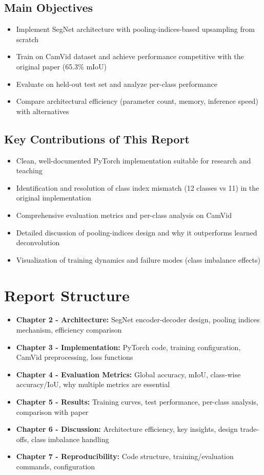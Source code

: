 \documentclass[11pt,a4paper]{report}
\begin{document}
\subsection*{Main Objectives}
\begin{itemize}
  \item Implement SegNet architecture with pooling-indices-based upsampling from scratch
  \item Train on CamVid dataset and achieve performance competitive with the original paper (65.3\% mIoU)
  \item Evaluate on held-out test set and analyze per-class performance
  \item Compare architectural efficiency (parameter count, memory, inference speed) with alternatives
\end{itemize}

\subsection*{Key Contributions of This Report}
\begin{itemize}
  \item Clean, well-documented PyTorch implementation suitable for research and teaching
  \item Identification and resolution of class index mismatch (12 classes vs 11) in the original implementation
  \item Comprehensive evaluation metrics and per-class analysis on CamVid
  \item Detailed discussion of pooling-indices design and why it outperforms learned deconvolution
  \item Visualization of training dynamics and failure modes (class imbalance effects)
\end{itemize}

\section*{Report Structure}

\begin{itemize}
  \item \textbf{Chapter 2 - Architecture:} SegNet encoder-decoder design, pooling indices mechanism, efficiency comparison
  \item \textbf{Chapter 3 - Implementation:} PyTorch code, training configuration, CamVid preprocessing, loss functions
  \item \textbf{Chapter 4 - Evaluation Metrics:} Global accuracy, mIoU, class-wise accuracy/IoU, why multiple metrics are essential
  \item \textbf{Chapter 5 - Results:} Training curves, test performance, per-class analysis, comparison with paper
  \item \textbf{Chapter 6 - Discussion:} Architecture efficiency, key insights, design trade-offs, class imbalance handling
  \item \textbf{Chapter 7 - Reproducibility:} Code structure, training/evaluation commands, configuration
\end{itemize}
\end{document}
